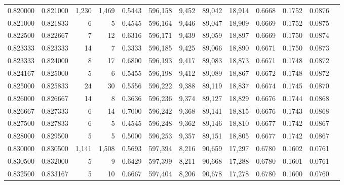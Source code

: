 \begin{tabular}{rrrrrrrrrrrrr}
0.820000 & 0.821000 &  1,230 & 1,469 &                                     0.5443 & 596,158 &   9,452 &  89,042 &  18,914 & 0.6668 & 0.1752 & 0.0876 \\
0.821000 & 0.821833 &      6 &     5 &                                     0.4545 & 596,164 &   9,446 &  89,047 &  18,909 & 0.6669 & 0.1752 & 0.0875 \\
0.822500 & 0.822667 &      7 &    12 &                                     0.6316 & 596,171 &   9,439 &  89,059 &  18,897 & 0.6669 & 0.1750 & 0.0874 \\
0.823333 & 0.823333 &     14 &     7 &                                     0.3333 & 596,185 &   9,425 &  89,066 &  18,890 & 0.6671 & 0.1750 & 0.0873 \\
0.823333 & 0.824000 &      8 &    17 &                                     0.6800 & 596,193 &   9,417 &  89,083 &  18,873 & 0.6671 & 0.1748 & 0.0872 \\
0.824167 & 0.825000 &      5 &     6 &                                     0.5455 & 596,198 &   9,412 &  89,089 &  18,867 & 0.6672 & 0.1748 & 0.0872 \\
0.825000 & 0.825833 &     24 &    30 &                                     0.5556 & 596,222 &   9,388 &  89,119 &  18,837 & 0.6674 & 0.1745 & 0.0870 \\
0.826000 & 0.826667 &     14 &     8 &                                     0.3636 & 596,236 &   9,374 &  89,127 &  18,829 & 0.6676 & 0.1744 & 0.0868 \\
0.826667 & 0.827333 &      6 &    14 &                                     0.7000 & 596,242 &   9,368 &  89,141 &  18,815 & 0.6676 & 0.1743 & 0.0868 \\
0.827500 & 0.827833 &      6 &     5 &                                     0.4545 & 596,248 &   9,362 &  89,146 &  18,810 & 0.6677 & 0.1742 & 0.0867 \\
0.828000 & 0.829500 &      5 &     5 &                                     0.5000 & 596,253 &   9,357 &  89,151 &  18,805 & 0.6677 & 0.1742 & 0.0867 \\
0.830000 & 0.830500 &  1,141 & 1,508 &                                     0.5693 & 597,394 &   8,216 &  90,659 &  17,297 & 0.6780 & 0.1602 & 0.0761 \\
0.830500 & 0.832000 &      5 &     9 &                                     0.6429 & 597,399 &   8,211 &  90,668 &  17,288 & 0.6780 & 0.1601 & 0.0761 \\
0.832500 & 0.833167 &      5 &    10 &                                     0.6667 & 597,404 &   8,206 &  90,678 &  17,278 & 0.6780 & 0.1600 & 0.0760 \\

\end{tabular}
